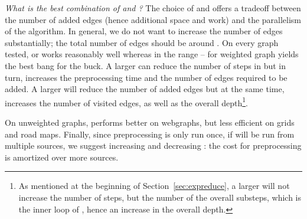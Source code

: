 \emph{What is the best combination of  and ?}  The choice of  and
 offers a tradeoff between the number of added edges (hence additional
space and work) and the parallelism of the algorithm.  In general, we do not
want to increase the number of edges substantially; the total number of edges
should be around .  On every graph tested,  or  works reasonably
well whereas  in the range -- for weighted graph
yields the best bang for the buck.  A larger  can reduce
the number of steps in \AlgName{} but in turn, increases the preprocessing time
and the number of edges required to be added. A larger  will reduce the
number of added edges but at the same time, increases the number of visited
edges, as well as the overall depth\footnote{As mentioned at the beginning of
  Section~\ref{sec:expreduce}, a larger  will not increase the number of
  steps, but the number of the overall substeps, which is the inner loop of
  \AlgName{}, hence an increase in the overall depth.}.

On unweighted graphs, \AlgName{} performs better on webgraphs, but less efficient on grids and road maps.
Finally, since
preprocessing is only run once, if \sssp will be run from multiple sources, we
suggest increasing  and decreasing : the cost for preprocessing is
amortized over more sources.

